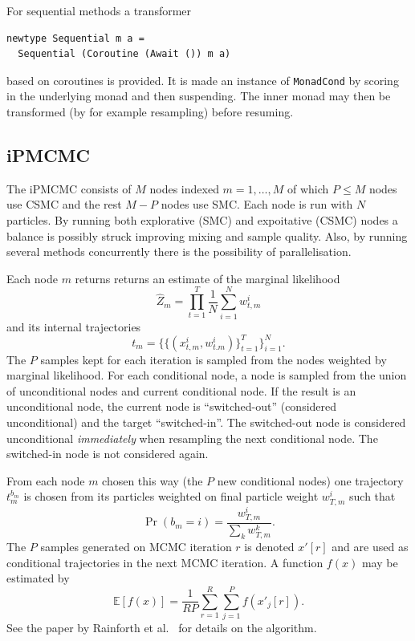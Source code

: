 For sequential methods a transformer
\begin{verbatim}
newtype Sequential m a =
  Sequential (Coroutine (Await ()) m a)
\end{verbatim}
based on coroutines is provided. It is made an instance of \texttt{MonadCond} by scoring in the underlying monad and then suspending. The inner monad may then be transformed (by for example resampling) before resuming.

\subsection{iPMCMC}
\label{sec:ipmcmc}
The iPMCMC consists of $M$ nodes indexed $m = 1,\dots,M$ of which $P \leq M$ nodes use CSMC and the rest $M-P$ nodes use SMC. Each node is run with $N$ particles. By running both explorative (SMC) and expoitative (CSMC) nodes a balance is possibly struck improving mixing and sample quality. Also, by running several methods concurrently there is the possibility of parallelisation.

Each node $m$ returns returns an estimate of the marginal likelihood
\begin{equation}
    \label{eq:zm}
    \hat Z_m = \prod\limits_{t=1}^T \frac 1 N \sum\limits_{i=1}^N w_{t,m}^i
\end{equation} and its internal trajectories
\begin{equation}
t_m = \{\{(x^i_{t,m},w^i_{t.m})\}_{t=1}^T\}_{i=1}^N .
\end{equation}
The $P$ samples kept for each iteration is sampled from the nodes weighted by marginal likelihood. For each conditional node, a node is sampled from the union of unconditional nodes and current conditional node. If the result is an unconditional node, the current node is ``switched-out'' (considered unconditional) and the target ``switched-in''. The switched-out node is considered unconditional \emph{immediately} when resampling the next conditional node. The switched-in node is not considered again.

From each node $m$ chosen this way (the $P$ new conditional nodes) one trajectory $t_m^{b_m}$ is chosen from its particles weighted on final particle weight $w_{T,m}^i$ such that
\begin{equation}
    \label{eq:ipmcmc-mcmc}
    \Pr(b_m = i) = \frac{w_{T,m}^i}{\sum_k w_{T,m}^k}.
\end{equation}
The $P$ samples generated on MCMC iteration $r$ is denoted $x'[r]$ and are used as conditional trajectories in the next MCMC iteration. A function $f(x)$ may be estimated by
\begin{equation}
    \mathbb{E}[f(x)] = \frac 1 {RP} \sum\limits_{r=1}^R \sum\limits_{j=1}^P f(x'_j[r]) .
\end{equation}
See the paper by Rainforth et al.~\cite{ipmcmc} for details on the algorithm.

